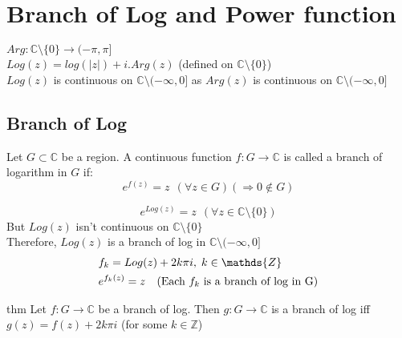 \chapter{Branch of Log and Power function}
$Arg: \mathds{C}\setminus \{0\} \rightarrow (-\pi,\pi]$\\
$Log(z)=log(|z|)+i.Arg(z)$ (defined on $\mathds{C}\setminus \{0\}$)\\
$Log(z)$ is continuous on $\mathds{C}\setminus (-\infty,0]$ as $Arg(z)$ is continuous on $\mathds{C}\setminus (-\infty,0]$\\
\section{\textbf{Branch of Log}}
\begin{defn}
Let $G\subset \mathds{C}$ be a region. A continuous function $f:G\rightarrow \mathds{C}$ is called a branch of logarithm in $G$ if:
\begin{equation*}
e^{f(z)}=z \:\:(\forall z\in G) (\Rightarrow 0\notin G)
\end{equation*}
\end{defn}
\begin{equation*}
e^{Log(z)}=z \:\: (\forall z\in \mathds{C}\setminus \{0\})
\end{equation*}
But $Log(z)$ isn't continuous on $\mathds{C}\setminus\{0\}$\\
Therefore, $Log(z)$ is a branch of log in $\mathds{C}\setminus (-\infty,0]$ 
\begin{align}
&f_k=Log(z)+2k\pi i\text{,}\:\: k\in \mathds{Z}\nonumber \\
&e^{f_k(z)}=z \:\:\hspace{2mm}(\text{Each $f_k$ is a branch of log in G})\nonumber
\end{align}
\begin{restatable}[]{thm}{}\label{}
Let $f:G\rightarrow \mathds{C}$ be a branch of log. Then $g:G\rightarrow \mathds{C}$ is a branch of log iff $g(z)=f(z)+2k\pi i$ (for some $k\in \mathds{Z}$)
\end{restatable}
